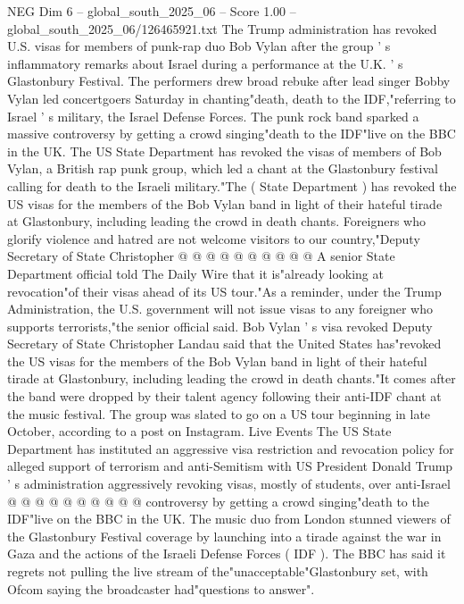 \begin{textsample}{NEG Dim 6 – global\_south\_2025\_06 – Score 1.00 – global\_south\_2025\_06/126465921.txt}  \label{ex:f6_neg_430}
The Trump administration has revoked U.S. visas for members of punk-rap duo Bob Vylan after the group ' s inflammatory remarks about Israel during a performance at the U.K. ' s Glastonbury Festival.
The performers drew broad rebuke after lead singer Bobby Vylan led concertgoers Saturday in chanting"death, death to the IDF,"referring to Israel ' s military, the Israel Defense Forces.
The punk rock band sparked a massive controversy by getting a crowd singing"death to the IDF"live on the BBC in the UK.
The US State Department has revoked the visas of members of Bob Vylan, a British rap punk group, which led a chant at the Glastonbury festival calling for death to the Israeli military."The ( State Department ) has revoked the US visas for the members of the Bob Vylan band in light of their hateful tirade at Glastonbury, including leading the crowd in death chants.
Foreigners who glorify violence and hatred are not welcome visitors to our country,"Deputy Secretary of State Christopher @ @ @ @ @ @ @ @ @ @ A senior State Department official told The Daily Wire that it is"already looking at revocation"of their visas ahead of its US tour."As a reminder, under the Trump Administration, the U.S. government will not issue visas to any foreigner who supports terrorists,"the senior official said.
Bob Vylan ' s visa revoked Deputy Secretary of State Christopher Landau said that the United States has"revoked the US visas for the members of the Bob Vylan band in light of their hateful tirade at Glastonbury, including leading the crowd in death chants."It comes after the band were dropped by their talent agency following their anti-IDF chant at the music festival.
The group was slated to go on a US tour beginning in late October, according to a post on Instagram.
Live Events The US State Department has instituted an aggressive visa restriction and revocation policy for alleged support of terrorism and anti-Semitism with US President Donald Trump ' s administration aggressively revoking visas, mostly of students, over anti-Israel @ @ @ @ @ @ @ @ @ @ controversy by getting a crowd singing"death to the IDF"live on the BBC in the UK.
The music duo from London stunned viewers of the Glastonbury Festival coverage by launching into a tirade against the war in Gaza and the actions of the Israeli Defense Forces ( IDF ).
The BBC has said it regrets not pulling the live stream of the"unacceptable"Glastonbury set, with Ofcom saying the broadcaster had"questions to answer".

\end{textsample}
